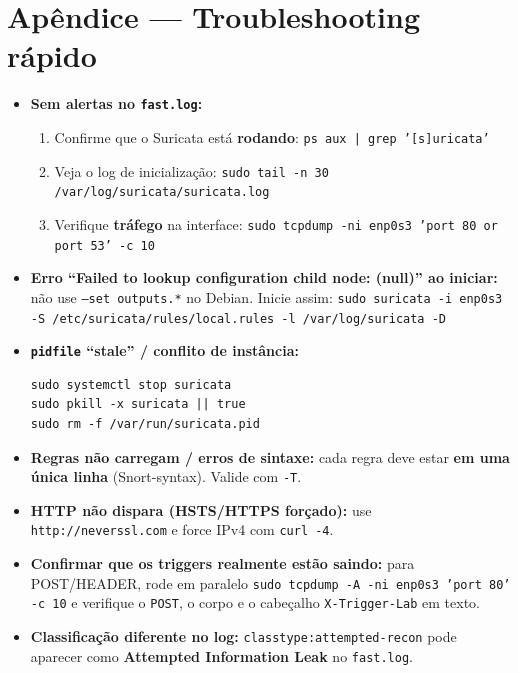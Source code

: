 \section*{Apêndice --- Troubleshooting rápido}

\begin{itemize}
  \item \textbf{Sem alertas no \texttt{fast.log}:}
    \begin{enumerate}
      \item Confirme que o Suricata está \textbf{rodando}: \texttt{ps aux | grep '[s]uricata'}
      \item Veja o log de inicialização: \texttt{sudo tail -n 30 /var/log/suricata/suricata.log}
      \item Verifique \textbf{tráfego} na interface: \texttt{sudo tcpdump -ni enp0s3 'port 80 or port 53' -c 10}
    \end{enumerate}

  \item \textbf{Erro ``Failed to lookup configuration child node: (null)'' ao iniciar:} não use \texttt{--set outputs.*} no Debian. Inicie assim: \texttt{sudo suricata -i enp0s3 -S /etc/suricata/rules/local.rules -l /var/log/suricata -D}

  \item \textbf{\texttt{pidfile} ``stale'' / conflito de instância:}
\begin{lstlisting}
sudo systemctl stop suricata
sudo pkill -x suricata || true
sudo rm -f /var/run/suricata.pid
\end{lstlisting}

  \item \textbf{Regras não carregam / erros de sintaxe:} cada regra deve estar \textbf{em uma única linha} (Snort-syntax). Valide com \texttt{-T}.

  \item \textbf{HTTP não dispara (HSTS/HTTPS forçado):} use \texttt{http://neverssl.com} e force IPv4 com \texttt{curl -4}.

  \item \textbf{Confirmar que os triggers realmente estão saindo:} para POST/HEADER, rode em paralelo \texttt{sudo tcpdump -A -ni enp0s3 'port 80' -c 10} e verifique o \texttt{POST}, o corpo e o cabeçalho \texttt{X-Trigger-Lab} em texto.

  \item \textbf{Classificação diferente no log:} \texttt{classtype:attempted-recon} pode aparecer como \textbf{Attempted Information Leak} no \texttt{fast.log}.
\end{itemize}


